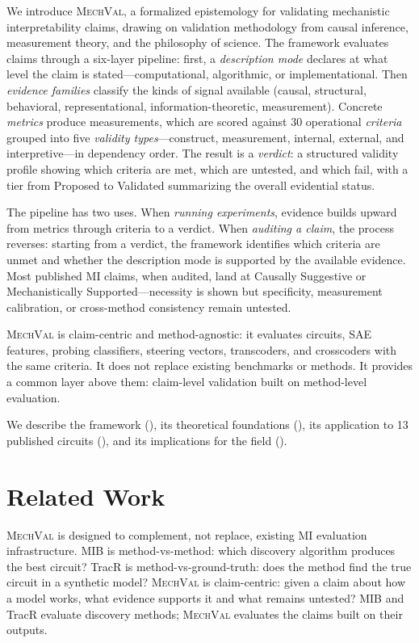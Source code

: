 \documentclass[10pt]{article}
\newcommand{\mechval}{\textsc{MechVal}}
\begin{document}
We introduce \mechval{}, a formalized epistemology for validating mechanistic interpretability claims, drawing on validation methodology from causal inference, measurement theory, and the philosophy of science. The framework evaluates claims through a six-layer pipeline: first, a \emph{description mode} declares at what level the claim is stated---computational, algorithmic, or implementational. Then \emph{evidence families} classify the kinds of signal available (causal, structural, behavioral, representational, information-theoretic, measurement). Concrete \emph{metrics} produce measurements, which are scored against 30 operational \emph{criteria} grouped into five \emph{validity types}---construct, measurement, internal, external, and interpretive---in dependency order. The result is a \emph{verdict}: a structured validity profile showing which criteria are met, which are untested, and which fail, with a tier from Proposed to Validated summarizing the overall evidential status.

The pipeline has two uses. When \emph{running experiments}, evidence builds upward from metrics through criteria to a verdict. When \emph{auditing a claim}, the process reverses: starting from a verdict, the framework identifies which criteria are unmet and whether the description mode is supported by the available evidence. Most published MI claims, when audited, land at Causally Suggestive or Mechanistically Supported---necessity is shown but specificity, measurement calibration, or cross-method consistency remain untested.

\mechval{} is claim-centric and method-agnostic: it evaluates circuits, SAE features, probing classifiers, steering vectors, transcoders, and crosscoders with the same criteria. It does not replace existing benchmarks or methods. It provides a common layer above them: claim-level validation built on method-level evaluation.

We describe the framework (), its theoretical foundations (), its application to 13 published circuits (), and its implications for the field ().

\section{Related Work}
\label{sec:related}

\mechval{} is designed to complement, not replace, existing MI evaluation infrastructure. MIB \citep{mueller2025mib} is method-vs-method: which discovery algorithm produces the best circuit? TracR \citep{lindner2024interp} is method-vs-ground-truth: does the method find the true circuit in a synthetic model? \mechval{} is claim-centric: given a claim about how a model works, what evidence supports it and what remains untested? MIB and TracR evaluate discovery methods; \mechval{} evaluates the claims built on their outputs.
\end{document}
